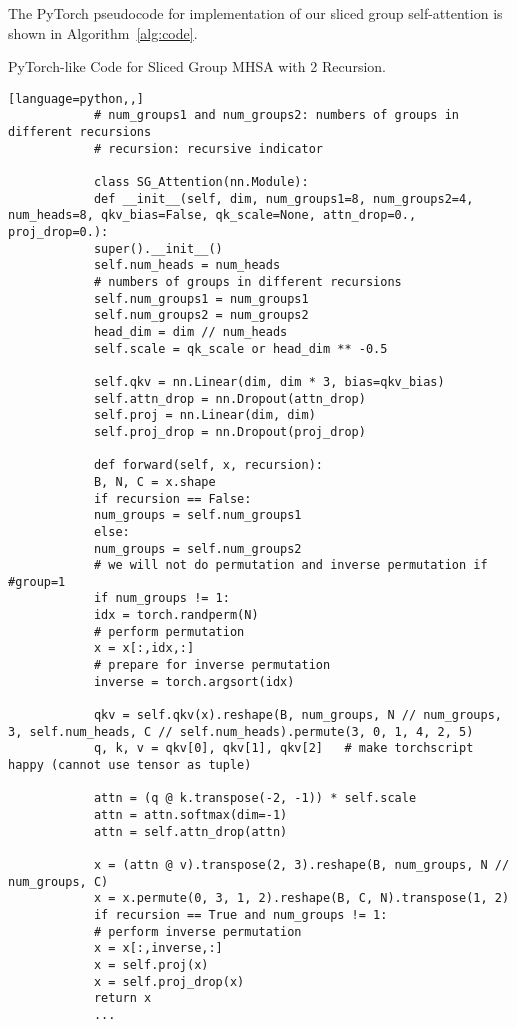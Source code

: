 \documentclass[runningheads]{llncs}
\begin{document}
	The PyTorch pseudocode for implementation of our sliced group self-attention is shown in Algorithm~\ref{alg:code}.
	
	
\begin{algorithm}[t] 
		\caption{PyTorch-like Code for Sliced Group MHSA with 2 Recursion.}
		\label{alg:code}
		\begin{lstlisting}[language=python,,]
			# num_groups1 and num_groups2: numbers of groups in different recursions
			# recursion: recursive indicator
			
			class SG_Attention(nn.Module):
			def __init__(self, dim, num_groups1=8, num_groups2=4, num_heads=8, qkv_bias=False, qk_scale=None, attn_drop=0., proj_drop=0.):
			super().__init__()
			self.num_heads = num_heads
			# numbers of groups in different recursions
			self.num_groups1 = num_groups1 
			self.num_groups2 = num_groups2
			head_dim = dim // num_heads
			self.scale = qk_scale or head_dim ** -0.5
			
			self.qkv = nn.Linear(dim, dim * 3, bias=qkv_bias)
			self.attn_drop = nn.Dropout(attn_drop)
			self.proj = nn.Linear(dim, dim)
			self.proj_drop = nn.Dropout(proj_drop)
			
			def forward(self, x, recursion):
			B, N, C = x.shape
			if recursion == False:
			num_groups = self.num_groups1
			else:
			num_groups = self.num_groups2
			# we will not do permutation and inverse permutation if #group=1
			if num_groups != 1:
			idx = torch.randperm(N)
			# perform permutation
			x = x[:,idx,:]
			# prepare for inverse permutation
			inverse = torch.argsort(idx)
			
			qkv = self.qkv(x).reshape(B, num_groups, N // num_groups, 3, self.num_heads, C // self.num_heads).permute(3, 0, 1, 4, 2, 5) 
			q, k, v = qkv[0], qkv[1], qkv[2]   # make torchscript happy (cannot use tensor as tuple)
			
			attn = (q @ k.transpose(-2, -1)) * self.scale
			attn = attn.softmax(dim=-1)
			attn = self.attn_drop(attn)
			
			x = (attn @ v).transpose(2, 3).reshape(B, num_groups, N // num_groups, C)
			x = x.permute(0, 3, 1, 2).reshape(B, C, N).transpose(1, 2)
			if recursion == True and num_groups != 1:
			# perform inverse permutation 
			x = x[:,inverse,:]
			x = self.proj(x)
			x = self.proj_drop(x)
			return x
			...
		\end{lstlisting} 
	\end{algorithm} 
\end{document}
